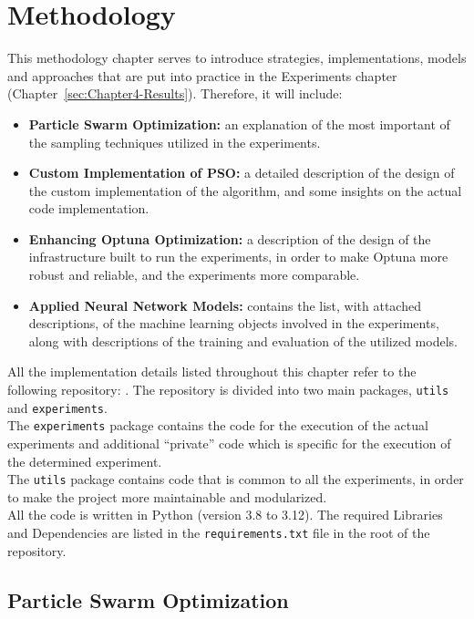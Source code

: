 \chapter{Methodology}\label{sec:Chapter3-Methodology}

This methodology chapter serves to introduce strategies, implementations, models and approaches that are put into practice in the Experiments chapter (Chapter~\ref{sec:Chapter4-Results}). Therefore, it will include:
\begin{itemize}[itemsep=0.1cm]
    \item \textbf{Particle Swarm Optimization:} an explanation of the most important of the sampling techniques utilized in the experiments.
    \item \textbf{Custom Implementation of PSO:} a detailed description of the design of the custom implementation of the algorithm, and some insights on the actual code implementation.
    \item \textbf{Enhancing Optuna Optimization:} a description of the design of the infrastructure built to run the experiments, in order to make Optuna more robust and reliable, and the experiments more comparable.
    \item \textbf{Applied Neural Network Models:} contains the list, with attached descriptions, of the machine learning objects involved in the experiments, along with descriptions of the training and evaluation of the utilized models.
\end{itemize}

All the implementation details listed throughout this chapter refer to the following repository: \cite{Repository-THESIS}.
The repository is divided into two main packages, \texttt{utils} and \texttt{experiments}.
\\[0.3cm]The \texttt{experiments} package contains the code for the execution of the actual experiments and additional “private” code which is specific for the execution of the determined experiment.
\\[0.3cm]The \texttt{utils} package contains code that is common to all the experiments, in order to make the project more maintainable and modularized.
\\[0.3cm]All the code is written in Python (version 3.8 to 3.12). The required Libraries and Dependencies are listed in the \texttt{requirements.txt} file in the root of the repository.

\section{Particle Swarm Optimization}

